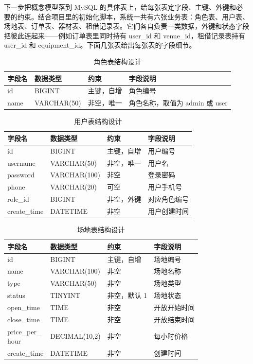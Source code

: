 下一步把概念模型落到 MySQL 的具体表上，给每张表定字段、主键、外键和必要的约束。结合项目里的初始化脚本，系统一共有六张业务表：角色表、用户表、场地表、订单表、器材表、租借记录表。它们各自负责一类数据，外键和状态字段把彼此连起来——例如订单表里同时持有 user\_id 和 venue\_id，租借记录表持有 user\_id 和 equipment\_id。下面几张表给出每张表的字段细节。

\begin{table}[htbp]
\centering
\caption{角色表结构设计}
\label{tab:role-table}
\small
\begin{tabularx}{\textwidth}{p{2.2cm}p{2.7cm}p{2.4cm}X}
\toprule
字段名 & 数据类型 & 约束 & 字段说明 \\
\midrule
id & BIGINT & 主键，自增 & 角色编号 \\
name & VARCHAR(50) & 非空，唯一 & 角色名称，取值为 admin 或 user \\
\bottomrule
\end{tabularx}
\end{table}

\begin{table}[htbp]
\centering
\caption{用户表结构设计}
\label{tab:user-table}
\small
\begin{tabularx}{\textwidth}{p{2.2cm}p{2.7cm}p{2.4cm}X}
\toprule
字段名 & 数据类型 & 约束 & 字段说明 \\
\midrule
id & BIGINT & 主键，自增 & 用户编号 \\
username & VARCHAR(50) & 非空，唯一 & 用户名 \\
password & VARCHAR(100) & 非空 & 登录密码 \\
phone & VARCHAR(20) & 可空 & 用户手机号 \\
role\_id & BIGINT & 非空，外键 & 对应角色编号 \\
create\_time & DATETIME & 非空 & 用户创建时间 \\
\bottomrule
\end{tabularx}
\end{table}

\begin{table}[htbp]
\centering
\caption{场地表结构设计}
\label{tab:venue-table}
\small
\begin{tabularx}{\textwidth}{p{2.2cm}p{2.7cm}p{2.4cm}X}
\toprule
字段名 & 数据类型 & 约束 & 字段说明 \\
\midrule
id & BIGINT & 主键，自增 & 场地编号 \\
name & VARCHAR(100) & 非空 & 场地名称 \\
type & VARCHAR(50) & 非空 & 场地类型 \\
status & TINYINT & 非空，默认 1 & 场地状态 \\
open\_time & TIME & 非空 & 开放开始时间 \\
close\_time & TIME & 非空 & 开放结束时间 \\
\makecell[l]{price\_per\_\\hour} & DECIMAL(10,2) & 非空 & 每小时价格 \\
create\_time & DATETIME & 非空 & 创建时间 \\
\bottomrule
\end{tabularx}
\end{table}

